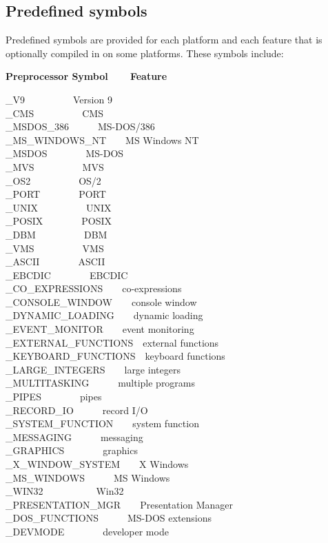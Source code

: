 \subsection*{Predefined symbols}

Predefined symbols are provided for each
platform and each feature that is optionally compiled in on some
platforms. These symbols include:

{\bfseries Preprocessor Symbol\ \ \ \ Feature}

\_V9\ \ \ \ \ \ \ \ \ \ Version 9\\
\_CMS\ \ \ \ \ \ \ \ \ \ CMS\\
\_MSDOS\_386\ \ \ \ \ \ MS-DOS/386\\
\_MS\_WINDOWS\_NT\ \ \ \ MS Windows NT\\
\_MSDOS\ \ \ \ \ \ \ \ MS-DOS\\
\_MVS\ \ \ \ \ \ \ \ \ \ MVS\\
\_OS2\ \ \ \ \ \ \ \ \ \ OS/2\\
\_PORT\ \ \ \ \ \ \ \ PORT\\
\_UNIX\ \ \ \ \ \ \ \ \ \ UNIX\\
\_POSIX\ \ \ \ \ \ \ \ POSIX\\
\_DBM\ \ \ \ \ \ \ \ \ \ DBM\\
\_VMS\ \ \ \ \ \ \ \ \ \ VMS\\
\_ASCII\ \ \ \ \ \ \ \ ASCII\\
\_EBCDIC\ \ \ \ \ \ \ \ EBCDIC\\
\_CO\_EXPRESSIONS\ \ \ \ co-expressions\\
\_CONSOLE\_WINDOW\ \ \ \ console window\\
\_DYNAMIC\_LOADING\ \ \ \ dynamic loading\\
\_EVENT\_MONITOR\ \ \ \ event monitoring\\
\_EXTERNAL\_FUNCTIONS\ \ external functions\\
\_KEYBOARD\_FUNCTIONS\ \ keyboard functions\\
\_LARGE\_INTEGERS\ \ \ \ large integers\\
\_MULTITASKING\ \ \ \ \ \ multiple programs\\
\_PIPES\ \ \ \ \ \ \ \ pipes\\
\_RECORD\_IO\ \ \ \ \ \ record I/O\\
\_SYSTEM\_FUNCTION\ \ \ \ system function\\
\_MESSAGING\ \ \ \ \ \ messaging\\
\_GRAPHICS\ \ \ \ \ \ \ \ graphics\\
\_X\_WINDOW\_SYSTEM\ \ \ \ X Windows\\
\_MS\_WINDOWS\ \ \ \ \ \ MS Windows\\
\_WIN32\ \ \ \ \ \ \ \ \ \ \ Win32\\
\_PRESENTATION\_MGR\ \ \ \ Presentation Manager\\
\_DOS\_FUNCTIONS\ \ \ \ \ \ MS-DOS extensions\\
\_DEVMODE\ \ \ \ \ \ \ \ developer mode

